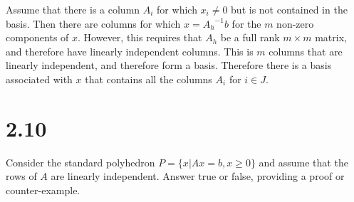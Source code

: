 \documentclass[12pt]{paper}
\newcommand{\inv}[1]{{#1}^{-1}}
\begin{document}
Assume that there is a column $A_i$ for which $x_i \neq 0$ but is not
contained in the basis. Then there are columns for which $x =
\inv{A_h}b$ for the $m$ non-zero components of $x$. However, this
requires that $A_h$ be a full rank $m \times m$ matrix, and therefore have
linearly independent columns. This is $m$ columns that are linearly
independent, and therefore form a basis. Therefore there is a basis
associated with $x$ that contains all the columns $A_i$ for $i \in J$.

\section{2.10}

Consider the standard polyhedron $P = \{ x \vert Ax = b, x \geq 0 \}$ and assume
that the rows of $A$ are linearly independent. Answer true or false,
providing a proof or counter-example.
\end{document}
